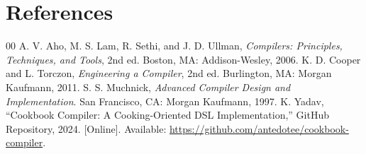 \documentclass[conference]{IEEEtran}
\begin{document}
\section*{References}
\begin{thebibliography}{00}
 A. V. Aho, M. S. Lam, R. Sethi, and J. D. Ullman, \textit{Compilers: Principles, Techniques, and Tools}, 2nd ed. Boston, MA: Addison-Wesley, 2006.
 K. D. Cooper and L. Torczon, \textit{Engineering a Compiler}, 2nd ed. Burlington, MA: Morgan Kaufmann, 2011.
 S. S. Muchnick, \textit{Advanced Compiler Design and Implementation}. San Francisco, CA: Morgan Kaufmann, 1997.
 K. Yadav, ``Cookbook Compiler: A Cooking-Oriented DSL Implementation,'' GitHub Repository, 2024. [Online]. Available: \url{https://github.com/antedotee/cookbook-compiler}.
\end{thebibliography}
\end{document}
